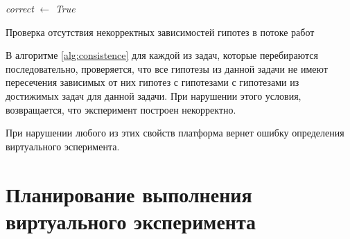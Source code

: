 \begin{algorithm}


    \textit{correct} $\gets$ \textit{True}

    \caption{Проверка отсутствия некорректных зависимостей гипотез в потоке работ}\label{alg:consistence}
\end{algorithm}


В алгоритме \ref{alg:consistence} для каждой из задач, которые перебираются последовательно, проверяется, что все гипотезы из 
данной задачи не имеют пересечения зависимых от них гипотез с гипотезами с гипотезами из достижимых задач для данной 
задачи. При нарушении этого условия, возвращается, что эксперимент построен некорректно.

При нарушении любого из этих свойств платформа вернет ошибку определения виртуального эсперимента.


\section{Планирование выполнения виртуального эксперимента}\label{sect2_}

